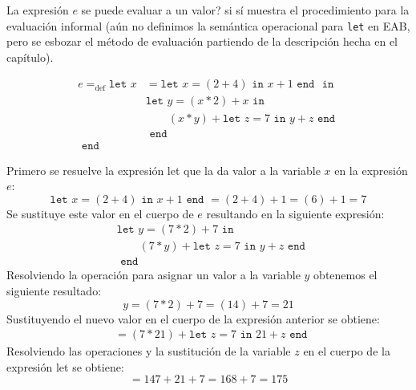     \bigskip

    \begin{exercise}
        La expresión $e$ se puede evaluar a un valor? si sí muestra el procedimiento para la evaluación informal (aún no definimos la semántica operacional para \texttt{let} en \textsf{EAB}, pero se esbozar el método de evaluación partiendo de la descripción hecha en el capítulo).
    
        \begin{align*}
        	e=_{\text{def}}\texttt{let  }
        		x&= \texttt{let }x = (2 + 4) \texttt{ in } x+1 \texttt{ end }
        		\texttt{ in }\\
        		 &\texttt{let }y=(x \ast 2)+x 
        		 	\texttt{ in } \\
        		 & \qquad(x\ast y) + \texttt{let }z=7 \texttt{ in } 
        		 						y+z 
        		 				\texttt{ end }\\
        		 &\texttt{ end }\\
        	\texttt{ end }&
        \end{align*}
    
        Primero se resuelve la expresión let que la da valor a la variable $x$ en la expresión $e$:
        \[
            \texttt{let }x = (2 + 4) \texttt{ in } x+1 \texttt{ end } 
             = (2+4) + 1 
             = (6) + 1
             = 7
        \]
        Se sustituye este valor en el cuerpo de $e$ resultando en la siguiente expresión:
        \begin{align*}
           & \texttt{let }y =(7 \ast 2)+7  \texttt{ in } \\
            & \qquad (7\ast y) + \texttt{let }z=7 \texttt{ in } y+z \texttt{ end }\\
            & \texttt{ end }
        \end{align*}
        Resolviendo la operación para asignar un valor a la variable $y$ obtenemos el siguiente resultado: 
        \[
            y = (7 \ast 2) + 7 
            = (14) + 7 
            = 21
        \]
        Sustituyendo el nuevo valor en el cuerpo de la expresión anterior se obtiene:
        \begin{align*}
                 & = (7 \ast 21) + \texttt{let } z=7 \texttt{ in } 21 + z \texttt{ end }
        \end{align*}
        Resolviendo las operaciones y la sustitución de la variable $z$ en el cuerpo de la expresión let se obtiene:
        \[
            = 147 + 21 + 7
            = 168 + 7
            = 175
        \]

    \end{exercise}

